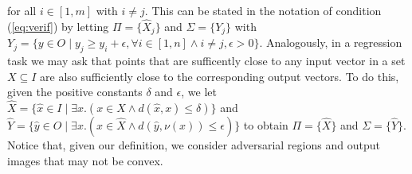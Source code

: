 for all $i \in [1,m]$ with $i \neq j$. This can be stated in the
notation of condition (\ref{eq:verif}) by letting $\Pi = \{ \hat{X}_j 
\}$ and $\Sigma = \{ Y_j \}$ with $Y_j = \{ y \in O \mid y_j \geq y_i
+ \epsilon, \forall i \in [1,n] \wedge i \neq j, \epsilon >
0\}$. Analogously, in 
a regression task we may ask that points that are sufficently close to
any input vector in a set $X \subseteq I$ are also sufficiently close
to the corresponding output vectors. To do this, given the positive
constants $\delta$ and $\epsilon$, we let $\hat{X} = \{ \hat{x} \in I
\mid \exists x. (x \in X \wedge d(\hat{x},x) \leq  \delta) \}$ and $\hat{Y}
= \{\hat{y} \in O \mid \exists x. (x \in \hat{X} \wedge d(\hat{y},\nu(x)) \leq
\epsilon)\}$ to obtain  
$\Pi = \{\hat{X}\}$ and $\Sigma = \{\hat{Y}\}$. Notice that, given our
definition, we consider adversarial regions and output images 
that may not be convex.
%
